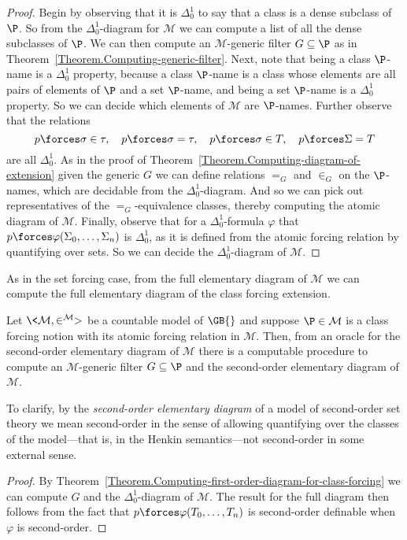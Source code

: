 \documentclass{amsart}
\begin{document}
\begin{proof}
Begin by observing that it is $\Delta^1_0$ to say that a class is a dense subclass of $\P$. So from the $\Delta^1_0$-diagram for $\mathcal M$ we can compute a list of all the dense subclasses of $\P$. We can then compute an $\mathcal M$-generic filter $G \subseteq \P$ as in Theorem~\ref{Theorem.Computing-generic-filter}. Next, note that being a class $\P$-name is a $\Delta^1_0$ property, because a class $\P$-name is a class whose elements are all pairs of elements of $\P$ and a set $\P$-name, and being a set $\P$-name is a $\Delta^1_0$ property. So we can decide which elements of $\mathcal M$ are $\P$-names. Further observe that the relations
$$
p \forces
\sigma \in \tau, \quad p \forces \sigma = \tau, \quad p \forces \sigma \in T, \quad p \forces \Sigma = T
$$
are all $\Delta^1_0$. As in the proof of Theorem~\ref{Theorem.Computing-diagram-of-extension} given the generic $G$ we can define relations $=_G$ and $\in_G$ on the $\P$-names, which are decidable from the $\Delta^1_0$-diagram. And so we can pick out representatives of the $=_G$-equivalence classes, thereby computing the atomic diagram of $\mathcal M$. Finally, observe that for a $\Delta^1_0$-formula $\varphi$ that $p \forces \varphi(\Sigma_0, \ldots, \Sigma_n)$ is $\Delta^1_0$, as it is defined from the atomic forcing relation by quantifying over sets. So we can decide the $\Delta^1_0$-diagram of $\mathcal M$.
\end{proof}
As in the set forcing case, from the full elementary diagram of $\mathcal M$ we can compute the full elementary diagram of the class forcing extension.
\begin{theorem}
Let $\<\mathcal{M},\in^{\mathcal{M}}>$ be a countable model of $\GB{}$ and suppose $\P \in \mathcal M$ is a class forcing notion with its atomic forcing relation in $\mathcal M$. Then, from an oracle for the second-order elementary diagram of $\mathcal M$ there is a computable procedure to compute an $\mathcal M$-generic filter $G \subseteq \P$ and the second-order elementary diagram of $\mathcal{M}$. \end{theorem}
To clarify, by the \emph{second-order elementary diagram} of a model of second-order set theory we mean second-order in the sense of allowing quantifying over the classes of the model---that is, in the Henkin semantics---not second-order in some external sense.
\begin{proof}
By Theorem~\ref{Theorem.Computing-first-order-diagram-for-class-forcing} we can compute $G$ and the $\Delta^1_0$-diagram of $\mathcal M$. The result for the full diagram then follows from the fact that $p \forces \varphi(T_0, \ldots, T_n)$ is second-order definable when $\varphi$ is second-order.
\end{proof}
\end{document}
